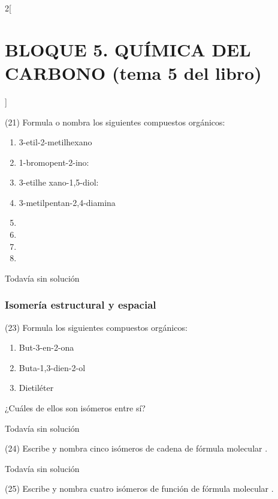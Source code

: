 \documentclass[10pt]{article}
\begin{document}
\begin{multicols}{2}[
  \section{BLOQUE 5. QUÍMICA DEL CARBONO (tema 5 del libro)}
  ]
\begin{exercise}
  (21) Formula o nombra los siguientes compuestos orgánicos:
  \begin{enumerate}
    \item 3-etil-2-metilhexano
    \item 1-bromopent-2-ino:
    \item 3-etilhe xano-1,5-diol:
    \item 3-metilpentan-2,4-diamina
    \item {}
    \item {}
    \item {}
    \item {}
  \end{enumerate}
\end{exercise}

\begin{solution}[print=false]
  Todavía sin solución
\end{solution}

\subsubsection{Isomería estructural y espacial}

\begin{exercise}
  (23) Formula los siguientes compuestos orgánicos:
  \begin{enumerate}
    \item But-3-en-2-ona
    \item Buta-1,3-dien-2-ol
    \item Dietiléter
  \end{enumerate}
  ¿Cuáles de ellos son isómeros entre sí?
\end{exercise}

\begin{solution}[print=false]
  Todavía sin solución
\end{solution}

\begin{exercise}
  (24) Escribe y nombra cinco isómeros de cadena de fórmula molecular .
\end{exercise}

\begin{solution}[print=false]
  Todavía sin solución
\end{solution}

\begin{exercise}
  (25) Escribe y nombra cuatro isómeros de función de fórmula molecular .
\end{exercise}


\end{multicols}
\end{document}
